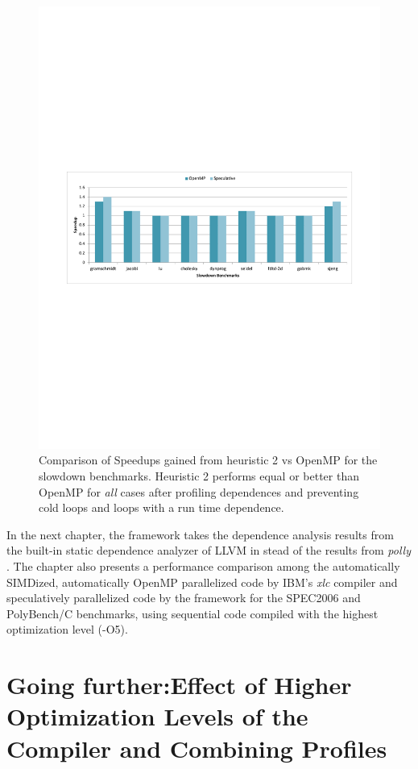 \documentclass[10pt]{report}          %
\begin{document}
\begin{figure}
\centering
\includegraphics[scale=0.75]{./pdf/heu2.pdf}
\caption{Comparison of Speedups gained from heuristic 2 vs OpenMP for the slowdown benchmarks. Heuristic 2 performs equal or better than OpenMP for \textit{all} cases after profiling dependences and preventing cold loops and loops with a run time dependence. }
\label{fig:heu2}
\end{figure}

In the next chapter, the framework takes the dependence analysis results from the built-in static dependence analyzer of LLVM in stead of the results from \textit{polly} .  The chapter also presents a performance comparison among the automatically SIMDized, automatically OpenMP parallelized code by IBM's \textit{xlc} compiler and speculatively parallelized code by the framework for the SPEC2006 and PolyBench/C benchmarks, using sequential code compiled with the highest optimization level (-O5).

\chapter{Going further:Effect of Higher Optimization Levels of the Compiler and Combining Profiles}
\label{chapter:O5}
\end{document}
